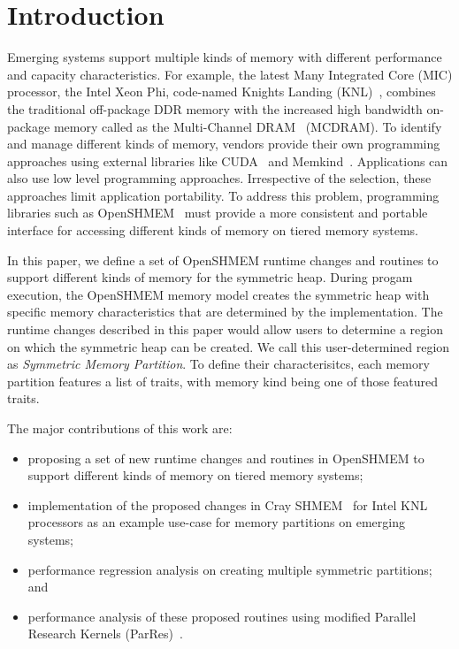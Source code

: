 \section{Introduction}
\label{src:intro}

Emerging systems support multiple kinds of memory with different
performance and capacity characteristics. For example, the latest
Many Integrated Core (MIC) processor, the Intel Xeon Phi,
code-named Knights Landing (KNL)~\cite{KNL}, combines the traditional
off-package DDR memory with the increased high bandwidth on-package
memory called as the Multi-Channel DRAM~\cite{MCDRAM} (MCDRAM). %
To identify and manage different kinds of memory,
vendors provide their own programming approaches
using external libraries like CUDA~\cite{cuda} and
Memkind~\cite{memkind}.
Applications can also use low level programming approaches.
Irrespective of the selection, these approaches limit application
portability. To address this problem, programming libraries such as
OpenSHMEM~\cite{osm} must provide a more consistent and portable
interface for accessing different kinds of memory on tiered memory systems.

In this paper, we define a set of OpenSHMEM runtime changes and routines
to support different kinds of memory for the symmetric heap. During
progam execution, the OpenSHMEM memory model creates the symmetric heap with specific
memory characteristics that are determined by the implementation.
The runtime changes described in this paper would allow users to
determine a region on which the symmetric heap can be created. We call this
user-determined region as \emph{Symmetric Memory Partition}. To define
their characterisitcs, each memory partition features a list of traits, with 
memory kind being one of those featured traits.

The major contributions of this work are:
\begin{itemize}
    \item proposing a set of new runtime changes and routines in
    OpenSHMEM to support different kinds of memory on tiered memory
    systems;
    \item implementation of the proposed changes in
    Cray SHMEM~\cite{csma} for Intel KNL processors as an example
    use-case for memory partitions on emerging systems;
    \item performance regression analysis on creating multiple
    symmetric partitions; and
    \item performance analysis of these proposed routines using
    modified Parallel Research Kernels (ParRes)~\cite{parres}.
\end{itemize}

